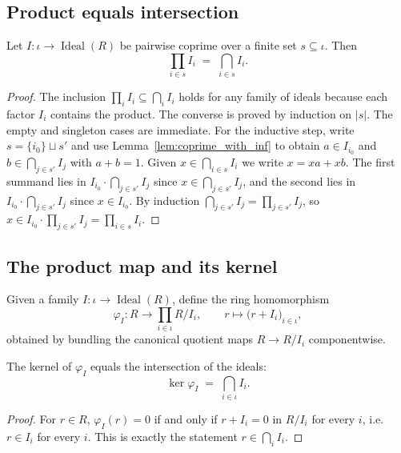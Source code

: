 \subsection{Product equals intersection}

\begin{lemma}
    \label{lem:prod_eq_inf}
    Let $I : \iota \to \operatorname{Ideal}(R)$ be pairwise coprime
    over a finite set $s \subseteq \iota$. Then
    \[
        \prod_{i \in s} I_i \;=\; \bigcap_{i \in s} I_i.
    \]
\end{lemma}
\begin{proof}
    The inclusion $\prod_i I_i \subseteq \bigcap_i I_i$ holds for any
    family of ideals because each factor $I_i$ contains the product.
    The converse is proved by induction on $|s|$. The empty and
    singleton cases are immediate. For the inductive step, write
    $s = \{i_0\} \sqcup s'$ and use Lemma~\ref{lem:coprime_with_inf} to
    obtain $a \in I_{i_0}$ and $b \in \bigcap_{j \in s'} I_j$ with
    $a + b = 1$. Given $x \in \bigcap_{i \in s} I_i$ we write
    $x = xa + xb$. The first summand lies in $I_{i_0} \cdot
    \bigcap_{j \in s'} I_j$ since $x \in \bigcap_{j \in s'} I_j$, and
    the second lies in $I_{i_0} \cdot \bigcap_{j \in s'} I_j$ since
    $x \in I_{i_0}$. By induction $\bigcap_{j \in s'} I_j = \prod_{j
    \in s'} I_j$, so $x \in I_{i_0} \cdot \prod_{j \in s'} I_j =
    \prod_{i \in s} I_i$.
\end{proof}

\subsection{The product map and its kernel}

\begin{definition}
    \label{def:pi_quotient_mk}
    Given a family $I : \iota \to \operatorname{Ideal}(R)$, define the
    ring homomorphism
    \[
        \varphi_I \colon R \longrightarrow \prod_{i \in \iota} R / I_i,
        \qquad r \longmapsto \bigl(r + I_i\bigr)_{i \in \iota},
    \]
    obtained by bundling the canonical quotient maps $R \to R/I_i$
    componentwise.
\end{definition}

\begin{lemma}
    \label{lem:ker_pi_quotient_mk}
    The kernel of $\varphi_I$ equals the intersection of the ideals:
    \[
        \ker \varphi_I \;=\; \bigcap_{i \in \iota} I_i.
    \]
\end{lemma}
\begin{proof}
    For $r \in R$, $\varphi_I(r) = 0$ if and only if $r + I_i = 0$ in
    $R/I_i$ for every $i$, i.e.\ $r \in I_i$ for every $i$. This is
    exactly the statement $r \in \bigcap_i I_i$.
\end{proof}

